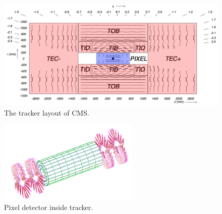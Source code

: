 \begin{figure}
 \begin{center}
  \includegraphics[width=\textwidth]{plot/tracker.png}
 \end{center}
\caption{\label{fig:tracker}The tracker layout of CMS.}
\end{figure}

\begin{figure}
 \begin{center}
  \includegraphics[width=0.6\textwidth]{plot/pixel.png}
 \end{center}
\caption{\label{fig:pixel}Pixel detector inside tracker.}
\end{figure}

